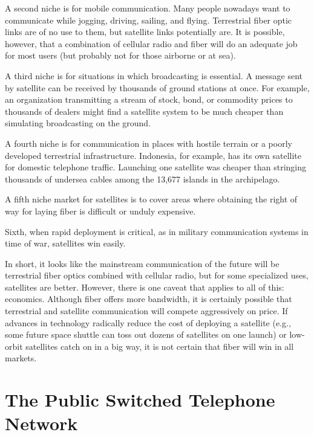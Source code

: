 A second niche is for mobile communication. Many people nowadays want to
communicate while jogging, driving, sailing, and flying. Terrestrial
fiber optic links are of no use to them, but satellite links potentially
are. It is possible, however, that a combination of cellular radio and
fiber will do an adequate job for most users (but probably not for those
airborne or at sea).

A third niche is for situations in which broadcasting is essential. A
message sent by satellite can be received by thousands of ground
stations at once. For example, an organization transmitting a stream of
stock, bond, or commodity prices to thousands of dealers might find a
satellite system to be much cheaper than simulating broadcasting on the
ground.

A fourth niche is for communication in places with hostile terrain or a
poorly developed terrestrial infrastructure. Indonesia, for example, has
its own satellite for domestic telephone traffic. Launching one
satellite was cheaper than stringing thousands of undersea cables among
the 13,677 islands in the archipelago.

A fifth niche market for satellites is to cover areas where obtaining
the right of way for laying fiber is difficult or unduly expensive.

Sixth, when rapid deployment is critical, as in military communication
systems in time of war, satellites win easily.

In short, it looks like the mainstream communication of the future will
be terrestrial fiber optics combined with cellular radio, but for some
specialized uses, satellites are better. However, there is one caveat
that applies to all of this: economics. Although fiber offers more
bandwidth, it is certainly possible that terrestrial and satellite
communication will compete aggressively on price. If advances in
technology radically reduce the cost of deploying a satellite (e.g.,
some future space shuttle can toss out dozens of satellites on one
launch) or low-orbit satellites catch on in a big way, it is not certain
that fiber will win in all markets.

\protect\hypertarget{0130661023_ch02lev1sec5.html}{}{}

\protect\hypertarget{0130661023_ch02lev1sec5.htmlux5cux23ch02lev1sec5}{}{}

\section{The Public Switched Telephone Network}

